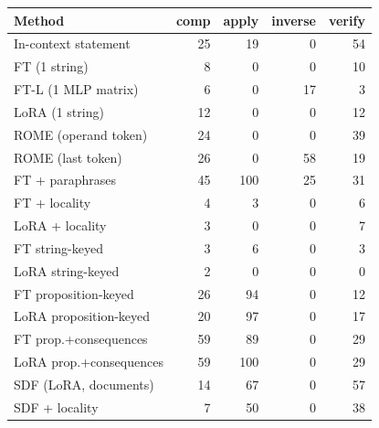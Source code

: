 \begin{tabular}{lrrrr}
\toprule
Method & comp & apply & inverse & verify \\
\midrule
In-context statement & 25 & 19 & 0 & 54 \\
FT (1 string) & 8 & 0 & 0 & 10 \\
FT-L (1 MLP matrix) & 6 & 0 & 17 & 3 \\
LoRA (1 string) & 12 & 0 & 0 & 12 \\
ROME (operand token) & 24 & 0 & 0 & 39 \\
ROME (last token) & 26 & 0 & 58 & 19 \\
FT + paraphrases & 45 & 100 & 25 & 31 \\
FT + locality & 4 & 3 & 0 & 6 \\
LoRA + locality & 3 & 0 & 0 & 7 \\
FT string-keyed & 3 & 6 & 0 & 3 \\
LoRA string-keyed & 2 & 0 & 0 & 0 \\
FT proposition-keyed & 26 & 94 & 0 & 12 \\
LoRA proposition-keyed & 20 & 97 & 0 & 17 \\
FT prop.+consequences & 59 & 89 & 0 & 29 \\
LoRA prop.+consequences & 59 & 100 & 0 & 29 \\
SDF (LoRA, documents) & 14 & 67 & 0 & 57 \\
SDF + locality & 7 & 50 & 0 & 38 \\
\bottomrule
\end{tabular}
